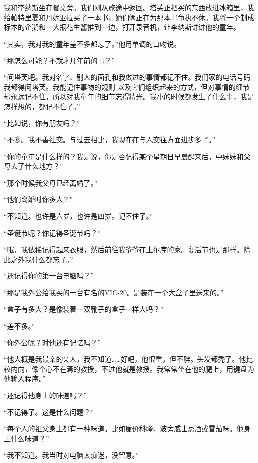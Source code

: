  

我和李纳斯坐在餐桌旁。我们刚从旅途中返回。塔芙正把买的东西放进冰箱里，我给帕特里夏和丹妮亚拉买了一本书，她们俩正在为那本书争执不休。我将一个制成标本的企鹅和一大瓶花生酱推到一边，打开录音机，让李纳斯讲讲他的童年。

“其实，我对我的童年差不多都忘了。”他用单调的口吻说。

“那怎么可能？不就才几年前的事？”

“问塔芙吧。我对名字、别人的面孔和我做过的事情都记不住。我们家的电话号码我都得问塔芙。我能记住事物的规则 以及它们组织起来的方式，但对事情的细节却永远记不住，所以对我童年的细节忘得精光。我小的时候都发生了什么事，我是怎样想的，都记不住了。”

“比如说，你有朋友吗？”

“不多。我不善社交。与过去相比，我现在在与人交往方面进步多了。”

“你的童年是什么样的？我是说，你是否记得某个星期日早晨醒来后，中妹妹和父母去了什么地方？”

“那个时候我父母已经离婚了。”

“他们离婚时你多大？”

“不知道。也许是六岁，也许是四岁。记不住了。”

“圣诞节呢？你记得圣诞节吗？”

“哦，我依稀记得起来衣服，然后前往我爷爷在土尔库的家。复活节也是那样。除此之外我什么都忘了。”

“还记得你的第一台电脑吗？”

“那是我外公给我买的一台有名的VIC-20。是装在一个大盒子里送来的。”

“盒子有多大？是像装着一双靴子的盒子一样大吗？”

“差不多。”

“你外公呢？对他还有记忆吗？”

“他大概是我最亲的亲人，我不知道……好吧，他很重，但不胖。头发都秃了。他比较内向，像个心不在焉的教授，不过他就是教授。我常常坐在他的腿上，用键盘为他输入程序。”

“还记得他身上的味道吗？”

“不记得了。这是什么问题？”

“每个人的祖父身上都有一种味道。比如廉价科隆、波旁威士忌酒或雪茄味。他身上什么味道？”

“我不知道。我当时对电脑太痴迷，没留意。”

